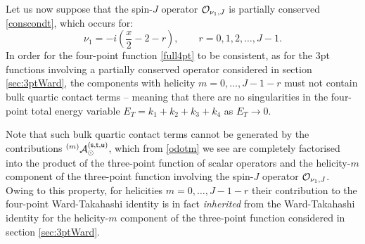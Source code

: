 \documentclass[11pt,a4paper]{article}
\begin{document}
Let us now suppose that the spin-$J$ operator ${\cal O}_{\nu_1,J}$ is partially conserved \eqref{conscondt}, which occurs for: 
\begin{equation}
    \nu_1 = - i \left(\frac{x}{2}-2-r\right), \qquad r = 0, 1, 2, \ldots, J-1.
\end{equation}
In order for the four-point function \eqref{full4pt} to be consistent, as for the 3pt functions involving a partially conserved operator considered in section \ref{sec:3ptWard}, the components with helicity $m=0, \ldots, J-1-r$ must not contain bulk quartic contact terms -- meaning that there are no singularities in the four-point total energy variable $E_T = k_1+k_2+k_3+k_4$ as $E_T \to 0$.

Note that such bulk quartic contact terms cannot be generated by the contributions ${}^{\left(m\right)}{\cal A}^{\left({\sf s}, {\sf t}, {\sf u}\right)}_\odot$, which from \eqref{odotm} we see are completely factorised into the product of the three-point function of scalar operators and the helicity-$m$ component of the three-point function involving the spin-$J$ operator ${\cal O}_{\nu_1,J}$. Owing to this property, for helicities $m=0, \ldots, J-1-r$ their contribution to the four-point Ward-Takahashi identity is in fact \emph{inherited} from the Ward-Takahashi identity for the helicity-$m$ component of the three-point function considered in section \ref{sec:3ptWard}.
\end{document}
